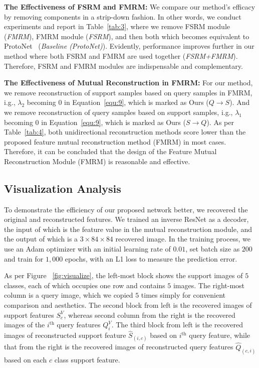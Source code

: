 \documentclass[letterpaper]{article} %
\begin{document}
\textbf{The Effectiveness of FSRM and FMRM:} We compare our method's efficacy by removing components in a strip-down fashion. In other words, we conduct experiments and report in Table~\ref{tab:3}, where we remove FSRM module (\textit{FMRM}), FMRM module (\textit{FSRM}), and then both which becomes equivalent to ProtoNet~\cite{NIPS2017_cb8da676} (\textit{Baseline (ProtoNet)}).
{Evidently, performance improves further in our method where both FSRM and FMRM are used together (\textit{FSRM+FMRM}). Therefore, FSRM and FMRM modules are indispensable and complementary.}



\textbf{The Effectiveness of Mutual Reconstruction in FMRM:} 
For our method, we remove reconstruction of support samples based on query samples in FMRM, i.g., $\lambda_2$ becoming $0$ in Equation~\ref{equ:9}, which is marked as Ours ($Q \to S$). And we remove reconstruction of query samples based on support samples, i.g., $\lambda_1$ becoming $0$ in Equation~\ref{equ:9}, which is marked as Ours ($S\to Q$). 
{As per Table~\ref{tab:4}, both unidirectional reconstruction methods score lower than the proposed feature mutual reconstruction method (FMRM) in most cases. Therefore, it can be concluded that the design of the Feature Mutual Reconstruction Module (FMRM) is reasonable and effective.}










\subsection{Visualization Analysis}


To demonstrate the efficiency of our proposed network better, we recovered the original and reconstructed features. We trained an inverse ResNet as a decoder, the input of which is the feature value in the mutual reconstruction module, and the output of which is a $3 \times 84 \times 84$ recovered image. In the training process, we use an Adam optimizer with an initial learning rate of $0.01$, set batch size as $200$ and train for $1,000$ epochs, with an L1 loss to measure the prediction error.


As per Figure ~\ref{fig:visualize}, the left-most block shows the support images of $5$ classes, each of which occupies one row and contains $5$ images. The right-most column is a query image, which we copied $5$ times simply for convenient comparison and aesthetics.
The second block from left is the recovered images of support features $S_c^V$, whereas second column from the right is the recovered images of the $i^\text{th}$ query features $Q_i^V$. 
The third block from left is the recovered images of reconstructed support feature $\hat{S}_{(i,c)}$ based on $i^\text{th}$ query feature, while that from the right is the recovered images of reconstructed query features $\hat{Q}_{(c,i)}$ based on each $c$ class support feature.
\end{document}
